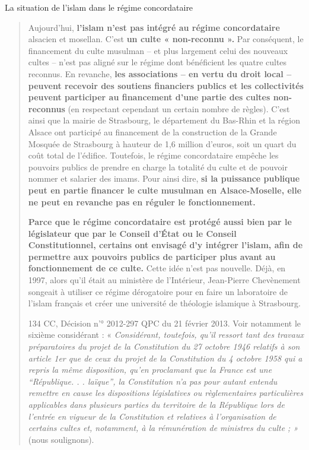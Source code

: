 La situation de l'islam dans le régime concordataire

\begin{quote}
Aujourd'hui, \textbf{l'islam n'est pas intégré au régime concordataire}
alsacien et mosellan. C'est \textbf{un culte « non-reconnu ».} Par
conséquent, le financement du culte musulman -- et plus largement celui
des nouveaux cultes -- n'est pas aligné sur le régime dont bénéficient
les quatre cultes reconnus. En revanche, \textbf{les associations -- en
vertu du droit local -- peuvent recevoir des soutiens financiers publics
et les collectivités peuvent participer au financement d'une partie des
cultes non-reconnus} (en respectant cependant un certain nombre de
règles). C'est ainsi que la mairie de Strasbourg, le département du
Bas-Rhin et la région Alsace ont participé au financement de la
construction de la Grande Mosquée de Strasbourg à hauteur de 1,6 million
d'euros, soit un quart du coût total de l'édifice. Toutefois, le régime
concordataire empêche les pouvoirs publics de prendre en charge la
totalité du culte et de pouvoir nommer et salarier des imams. Pour ainsi
dire, \textbf{si la puissance publique peut en partie financer le culte
musulman en Alsace-Moselle, elle ne peut en revanche pas en réguler le
fonctionnement.}

\textbf{Parce que le régime concordataire est protégé aussi bien par le
législateur que par le Conseil d'État ou le Conseil Constitutionnel,
certains ont envisagé d'y intégrer l'islam, afin de permettre aux
pouvoirs publics de participer plus avant au fonctionnement de ce
culte.} Cette idée n'est pas nouvelle. Déjà, en 1997, alors qu'il était
au ministère de l'Intérieur, Jean-Pierre Chevènement songeait à utiliser
ce régime dérogatoire pour en faire un laboratoire de l'islam français
et créer une université de théologie islamique à Strasbourg.

134 CC, Décision n'° 2012-297 QPC du 21 février 2013. Voir notamment le
sixième considérant : « \emph{Considérant, toutefois, qu'il ressort tant
des travaux préparatoires du projet de la Constitution du 27 octobre
1946 relatifs à son article 1er que de ceux du projet de la Constitution
du 4 octobre 1958 qui a repris la même disposition, qu'en proclamant que
la France est une ``République. . . laïque'', la Constitution n'a pas
pour autant entendu remettre en cause les dispositions législatives ou
règlementaires particulières applicables dans plusieurs parties du
territoire de la République lors de l'entrée en vigueur de la
Constitution et relatives à l'organisation de certains cultes et,
notamment, à la rémunération de ministres du culte ; »} (nous
soulignons).




\end{quote}
